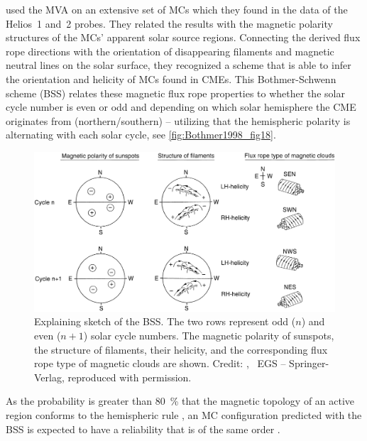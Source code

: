 \citet{Bothmer1998} used the MVA on an extensive set of MCs which they found in the data of the Helios~1 and~2 probes. They related the results with the magnetic polarity structures of the MCs' apparent solar source regions. Connecting the derived flux rope directions with the orientation of disappearing filaments and magnetic neutral lines on the solar surface, they recognized a scheme that is able to infer the orientation and helicity of MCs found in CMEs. This Bothmer-Schwenn scheme (BSS) relates these magnetic flux rope properties to whether the solar cycle number is even or odd and depending on which solar hemisphere the CME originates from (northern/southern) -- utilizing that the hemispheric polarity is alternating with each solar cycle, see \autoref{fig:Bothmer1998_fig18}.
\begin{figure}[htb]
	\centering
	\includegraphics[width=\textwidth]{figures_of_others/images/Bothmer1998_fig18.png}
	\caption[Credit: {\citet[Fig.~18]{Bothmer1998}}, \textcopyright~EGS -- Springer-Verlag, reproduced with permission.]
	{Explaining sketch of the BSS. The two rows represent odd ($n$) and even ($n + 1$) solar cycle numbers. The magnetic polarity of sunspots, the structure of filaments, their helicity, and the corresponding flux rope type of magnetic clouds are shown. Credit: {\citet[Fig.~18]{Bothmer1998}}, \textcopyright~EGS -- Springer-Verlag, reproduced with permission.}
	\label{fig:Bothmer1998_fig18}
\end{figure}
As the probability is greater than \SI{80}{\percent} that the magnetic topology of an active region conforms to the hemispheric rule \citep{Wang2013}, an MC configuration predicted with the BSS is expected to have a reliability that is of the same order \citep{Savani2015}.

